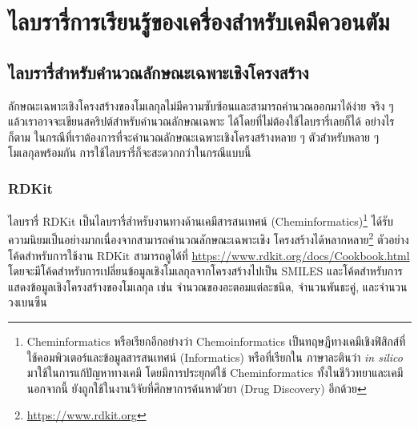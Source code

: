 

\chapter{ไลบรารี่การเรียนรู้ของเครื่องสำหรับเคมีควอนตัม}
\label{ch:ml_lib}

\section{ไลบรารี่สำหรับคำนวณลักษณะเฉพาะเชิงโครงสร้าง}
\label{sec:lib_feat}

ลักษณะเฉพาะเชิงโครงสร้างของโมเลกุลไม่มีความซับซ้อนและสามารถคำนวณออกมาได้ง่าย จริง ๆ แล้วเราอาจจะเขียนสคริปต์สำหรับคำนวณลักษณเฉพาะ%
ได้โดยที่ไม่ต้องใช้ไลบรารี่เลยก็ได้ อย่างไรก็ตาม ในกรณีที่เราต้องการที่จะคำนวณลักษณะเฉพาะเชิงโครงสร้างหลาย ๆ ตัวสำหรับหลาย ๆ โมเลกุลพร้อมกัน 
การใช้ไลบรารี่ก็จะสะดวกกว่าในกรณีแบบนี้

\subsection{RDKit}
\label{ssec:rdkit}

ไลบรารี่ RDKit\autocite{rdkit} เป็นไลบรารี่สำหรับงานทางด้านเคมีสารสนเทศน์ (Cheminformatics)\footnote{Cheminformatics
หรือเรียกอีกอย่างว่า Chemoinformatics เป็นทฤษฎีทางเคมีเชิงฟิสิกส์ที่ใช้คอมพิวเตอร์และข้อมูลสารสนเทศน์ (Informatics) หรือที่เรียกใน%
ภาษาละตินว่า \textit{in silico} มาใช้ในการแก้ปัญหาทางเคมี โดยมีการประยุกต์ใช้ Cheminformatics ทั้งในชีวิวทยาและเคมี นอกจากนี้%
ยังถูกใช้ในงานวิจัยที่ศึกษาการค้นหาตัวยา (Drug Discovery) อีกด้วย} ได้รับความนิยมเป็นอย่างมากเนื่องจากสามารถคำนวณลักษณะเฉพาะเชิง%
โครงสร้างได้หลากหลาย\footnote{\url{https://www.rdkit.org}} ตัวอย่างโค้ดสำหรับการใช้งาน RDKit สามารถดูได้ที่ 
\url{https://www.rdkit.org/docs/Cookbook.html} โดยจะมีโค้ดสำหรับการเปลี่ยนข้อมูลเชิงโมเลกุลจากโครงสร้างไปเป็น SMILES 
และโค้ดสำหรับการแสดงข้อมูลเชิงโครงสร้างของโมเลกุล เช่น จำนวณของอะตอมแต่ละชนิด, จำนวนพันธะคู่, และจำนวนวงเบนซีน 

